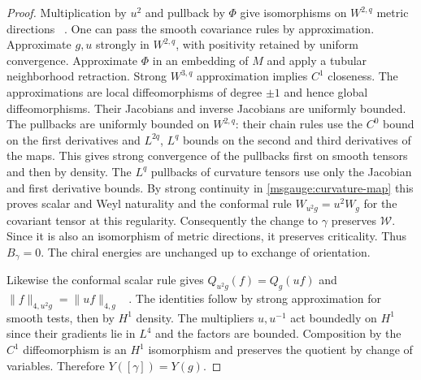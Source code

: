 \documentclass[11pt]{article}
\numberwithin{equation}{section}
\theoremstyle{definition}
\theoremstyle{remark}
\begin{document}
\begin{proof}
Multiplication by \(u^2\) and pullback by \(\Phi\) give isomorphisms
on \(W^{2,q}\) metric directions%
~\cite[Lemmas 2.1 and 2.4]{AvalosCogoRoyoAbrego2026Bach}.
One can pass the smooth covariance rules by approximation. Approximate
\(g,u\) strongly in \(W^{2,q}\), with positivity retained by uniform
convergence. Approximate \(\Phi\) in an embedding of \(M\) and apply a
tubular neighborhood retraction. Strong \(W^{3,q}\) approximation
implies \(C^1\) closeness. The approximations are local diffeomorphisms
of degree \(\pm1\) and hence global diffeomorphisms. Their Jacobians
and inverse Jacobians are uniformly bounded. The pullbacks are
uniformly bounded on \(W^{2,q}\): their chain rules use the \(C^0\)
bound on the first derivatives and \(L^{2q}\), \(L^q\) bounds on the
second and third derivatives of the maps. This gives strong
convergence of the pullbacks first on smooth tensors and then
by density. The \(L^q\) pullbacks of curvature tensors use only the
Jacobian and first derivative bounds. By strong continuity in
\eqref{msgauge:curvature-map} this proves scalar and Weyl naturality
and the conformal rule \(W_{u^2g}=u^2W_g\) for the covariant tensor
at this regularity. Consequently the change to \(\gamma\) preserves
\(\mathcal W\). Since it is also an isomorphism of metric directions,
it preserves criticality. Thus \(B_\gamma=0\). The chiral energies
are unchanged up to exchange of orientation.

Likewise the conformal scalar rule gives
\(Q_{u^2g}(f)=Q_g(uf)\) and \(\|f\|_{4,u^2g}=\|uf\|_{4,g}\)%
~\cite[\S2, (2.6)--(2.7)]{LeeParker1987Yamabe}.
The identities follow by strong approximation for smooth tests,
then by \(H^1\) density. The multipliers \(u,u^{-1}\) act boundedly
on \(H^1\) since their gradients lie in \(L^4\) and the factors
are bounded. Composition by the \(C^1\) diffeomorphism is an
\(H^1\) isomorphism and preserves the quotient by change of variables.
Therefore \(Y([\gamma])=Y(g)\).


\end{proof}
\end{document}
